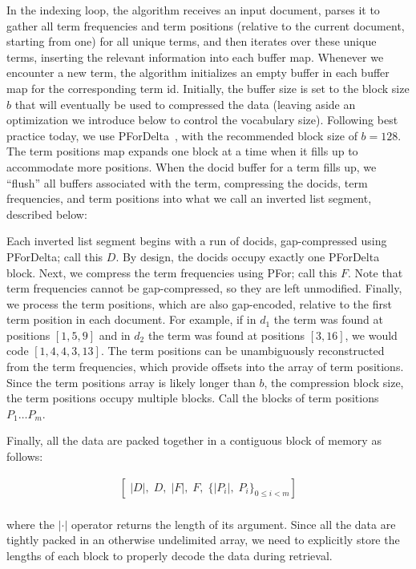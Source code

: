 In the indexing loop, the algorithm receives an input document, parses it to gather all term frequencies and term positions (relative to the current document, starting from one) for all unique terms, and then iterates over these unique terms, inserting the relevant information into each buffer map. Whenever we encounter a new term, the algorithm initializes an empty buffer in each buffer map for the corresponding term id. Initially, the buffer size is set to the block size $b$ that will eventually be used to compressed the data (leaving aside an optimization we introduce below to control the vocabulary size). Following best practice today, we use PForDelta~\cite{ZukowskiICDE2006,Yan_etal_WWW2009}, with the recommended block size of $b=128$. The term positions map expands one block at a time when it fills up to accommodate more positions. When the docid buffer for a term fills up, we ``flush'' all buffers associated with the term, compressing the docids, term frequencies, and term positions into what we call 
an inverted list segment, described below:

Each inverted list segment begins with a run of docids, gap-compressed using PForDelta; call this $D$. By design, the docids occupy exactly one PForDelta block. Next, we compress the term frequencies using PFor; call this $F$. Note that term frequencies cannot be gap-compressed, so they are left unmodified. Finally, we process the term positions, which are also gap-encoded, relative to the first term position in each document. For example, if in $d_1$ the term was found at positions $[1, 5, 9]$ and in $d_2$ the term was found at positions $[3, 16]$, we would code $[1, 4, 4, 3, 13]$. The term positions can be unambiguously reconstructed from the term frequencies, which provide offsets into the array of term positions. Since the term positions array is likely longer than $b$, the compression block size, the term positions occupy multiple blocks. Call the blocks of term positions $P_1 \ldots P_m$.

Finally, all the data are packed together in a contiguous block of memory as follows:

\begin{displaymath}
  \begin{array}{l}
    \left[\; |D|,\; D,\; |F|,\; F,\; \{ |P_i|,\; P_i \}_{0 \leq i < m} \right] \\
  \end{array}
\end{displaymath}

\noindent where the $|\cdot|$ operator returns the length of its argument. Since all the data are tightly packed in an otherwise undelimited array, we need to explicitly store the lengths of each block to properly decode the data during retrieval.


